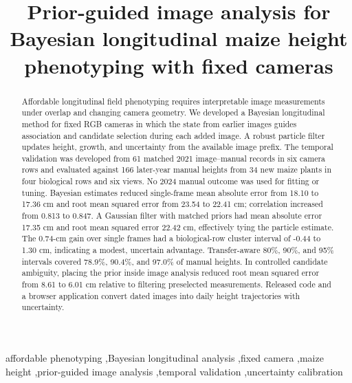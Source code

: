 \documentclass[review,12pt,authoryear]{elsarticle}
\begin{document}
\begin{frontmatter}
\title{Prior-guided image analysis for Bayesian longitudinal maize height phenotyping with fixed cameras}
\begin{abstract}
Affordable longitudinal field phenotyping requires interpretable image measurements under overlap and changing camera geometry. We developed a Bayesian longitudinal method for fixed RGB cameras in which the state from earlier images guides association and candidate selection during each added image. A robust particle filter updates height, growth, and uncertainty from the available image prefix. The temporal validation was developed from 61 matched 2021 image--manual records in six camera rows and evaluated against 166 later-year manual heights from 34 new maize plants in four biological rows and six views. No 2024 manual outcome was used for fitting or tuning. Bayesian estimates reduced single-frame mean absolute error from 18.10 to 17.36 cm and root mean squared error from 23.54 to 22.41 cm; correlation increased from 0.813 to 0.847. A Gaussian filter with matched priors had mean absolute error 17.35 cm and root mean squared error 22.42 cm, effectively tying the particle estimate. The 0.74-cm gain over single frames had a biological-row cluster interval of -0.44 to 1.30 cm, indicating a modest, uncertain advantage. Transfer-aware 80\%, 90\%, and 95\% intervals covered 78.9\%, 90.4\%, and 97.0\% of manual heights. In controlled candidate ambiguity, placing the prior inside image analysis reduced root mean squared error from 8.61 to 6.01 cm relative to filtering preselected measurements. Released code and a browser application convert dated images into daily height trajectories with uncertainty.
\end{abstract}
\begin{keyword}
affordable phenotyping \sep Bayesian longitudinal analysis \sep fixed camera \sep maize height \sep prior-guided image analysis \sep temporal validation \sep uncertainty calibration
\end{keyword}
\end{frontmatter}
\doublespacing
\linenumbers
\end{document}
